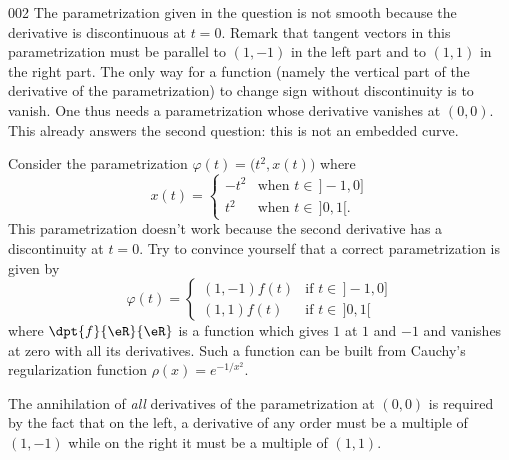 \begin{corrige}{002}
The parametrization given in the question is not smooth because the derivative is discontinuous at $t=0$. Remark that tangent vectors in this parametrization must be parallel to $(1,-1)$ in the left part and to $(1,1)$ in the right part. The only way for a function (namely the vertical part of the derivative of the parametrization) to change sign without discontinuity is to vanish. One thus needs a parametrization whose derivative vanishes at $(0,0)$. This already answers the second question: this is not an embedded curve.
 
Consider the parametrization $\varphi(t)=\big( t^2, x(t) \big)$ where
\[ 
  x(t)=
\begin{cases}
 -t^2& \text{when }t\in\,]-1,0]\\
t^2  & \text{when }t\in\,]0,1[.
\end{cases}
\]
This parametrization doesn't work because the second derivative has a discontinuity at $t=0$. Try to convince yourself that a correct parametrization is given by
\[ 
  \varphi(t)=
\begin{cases}
(1,-1)f(t)&\text{if }t\in\,]-1,0]\\
(1,1)f(t) &\text{if }t\in\,]0,1[
\end{cases}
\]
where $\dpt{ f }{ \eR }{ \eR }$ is a function which gives $1$ at $1$ and $-1$ and vanishes at zero with all its derivatives. Such a function can be built from Cauchy's regularization function $\rho(x)=e^{-1/x^2}$.

The annihilation of \emph{all} derivatives of the parametrization at $(0,0)$ is required by the fact that on the left, a derivative of any order must be a multiple of $(1,-1)$ while on the right it must be a multiple of $(1,1)$.


\end{corrige}
